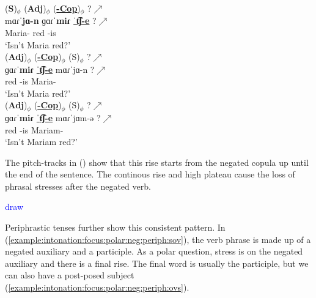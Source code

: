 \begin{exe}
	\ex \begin{xlist}
		\ex \glll   (\textbf{S})$_\phi$ (\textbf{Adj})$_\phi$ (\underline{\textbf{{\neggloss}-Cop}})$_\phi$ ?$\nearrow$ \\
		mɑɾˈ\textbf{jɑ-n} {ɡɑɾˈ\textbf{miɾ}} \underline{ˈ\textbf{t͡ʃ-e}} ?$\nearrow$ \\
		Maria-{} red   {\neggloss}-is \\ 
		\trans `Isn't Maria   red?' 
		\label{example:intonation:focus:polar:neg:cop:sov}
		\\ 
		\ex \glll    (\textbf{Adj})$_\phi$ (\underline{\textbf{{\neggloss}-Cop}})$_\phi$ ({S})$_\phi$ ?$\nearrow$ \\
		{ɡɑɾˈ\textbf{miɾ}} \underline{ˈ\textbf{t͡ʃ-e}} mɑɾˈ{jɑ-n}  ?$\nearrow$ \\
		red   {\neggloss}-is Maria-{} \\ 
		\trans `Isn't Maria     red?' 
		\\ 
		\label{example:intonation:focus:polar:neg:cop:ovsfull}
		\ex \glll    (\textbf{Adj})$_\phi$ (\underline{\textbf{{\neggloss}-Cop}})$_\phi$ ({S})$_\phi$ ?$\nearrow$ \\
		{ɡɑɾˈ\textbf{miɾ}} \underline{ˈ\textbf{t͡ʃ-e}} mɑɾˈ{jɑ}m-ə  ?$\nearrow$ \\
		red   {\neggloss}-is Mariam-{} \\ 
		\trans `Isn't Mariam red?'
		\label{example:intonation:focus:polar:neg:cop:ovsschwa}
		\\ 
	\end{xlist}
\end{exe}

The pitch-tracks in () show that this rise starts from the negated copula up until the end of the sentence. The continous rise and high plateau cause the loss of phrasal stresses after the negated verb. 

\textcolor{blue}{draw}

Periphrastic tenses further show this consistent pattern. In (\ref{example:intonation:focus:polar:neg:periph:sov}), the verb phrase is made up of a negated auxiliary and a participle. As a polar question, stress is on the negated auxiliary  and there is a final rise. The final word is usually   the participle, but we can also have a post-posed subject (\ref{example:intonation:focus:polar:neg:periph:ovs}). 

